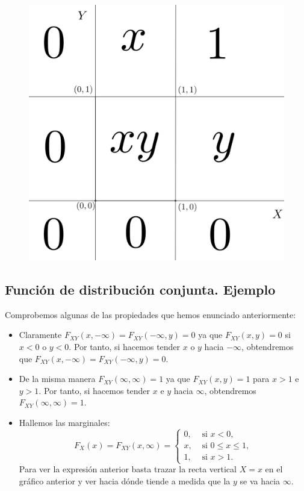 \documentclass[]{book}
\begin{document}
\begin{figure}
\includegraphics[width=450px]{Images/FxyEx} \end{figure}

\hypertarget{funciuxf3n-de-distribuciuxf3n-conjunta.-ejemplo-2}{%
\subsection{Función de distribución conjunta. Ejemplo}\label{funciuxf3n-de-distribuciuxf3n-conjunta.-ejemplo-2}}

Comprobemos algunas de las propiedades que hemos enunciado anteriormente:

\begin{itemize}
\item
  Claramente \(F_{XY}(x,-\infty)=F_{XY}(-\infty,y)=0\) ya que \(F_{XY}(x,y)=0\) si \(x<0\) o \(y<0\). Por tanto, si hacemos tender \(x\) o \(y\) hacia \(-\infty\), obtendremos que \(F_{XY}(x,-\infty)=F_{XY}(-\infty,y)=0\).
\item
  De la misma manera \(F_{XY}(\infty,\infty)=1\) ya que \(F_{XY}(x,y)=1\) para \(x>1\) e \(y>1\). Por tanto, si hacemos tender \(x\) e \(y\) hacia \(\infty\), obtendremos \(F_{XY}(\infty,\infty)=1\).
\item
  Hallemos las marginales:
  \[
  F_X(x)=F_{XY}(x,\infty)=\begin{cases}
  0, & \mbox{ si }x<0,\\
  x, & \mbox{ si } 0\leq x\leq 1,\\
  1, & \mbox{ si } x>1.
  \end{cases}
  \]
  Para ver la expresión anterior basta trazar la recta vertical \(X=x\) en el gráfico anterior y ver hacia dónde tiende a medida que la \(y\) se va hacia \(\infty\).
\end{itemize}
\end{document}
